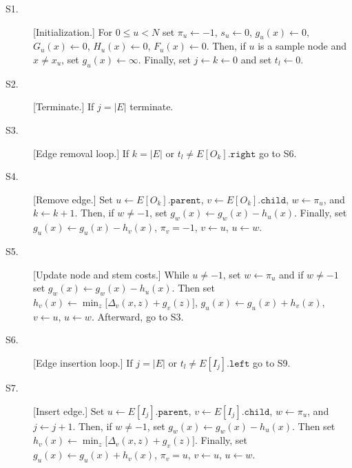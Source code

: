 \begin{description}

\item[S1.] [Initialization.]
    For $0 \leq u < N$
        set $\pi_u \leftarrow -1$,
        $s_u \leftarrow 0$,
        $g_u(x) \leftarrow 0$,
        $G_u(x) \leftarrow 0$,
        $H_u(x) \leftarrow 0$,
        $F_u(x) \leftarrow 0$.
        Then,
        if $u$ is a sample node and $x \neq x_u$,
            set $g_u(x) \leftarrow \infty$.
    Finally,
        set $j \leftarrow k \leftarrow 0$ and set $t_l \leftarrow 0$.

\item[S2.] [Terminate.]
    If $j = |E|$ terminate.

\item[S3.] [Edge removal loop.]
    If $k = |E|$ or $t_l \neq E[O_k].\texttt{right}$ go to S6.

\item[S4.] [Remove edge.]
    Set $u \leftarrow E[O_k].\texttt{parent}$,
        $v \leftarrow E[O_k].\texttt{child}$,
        $w \leftarrow \pi_u$, and
        $k \leftarrow k + 1$.
        Then,
        if $w \neq -1$,
            set $g_w(x) \leftarrow g_w(x) - h_u(x)$.
        Finally,
        set $g_u(x) \leftarrow g_u(x) - h_v(x)$,
        $\pi_v = -1$,
        $v \leftarrow u$,
        $u \leftarrow w$.

\item[S5.] [Update node and stem costs.]
    While $u \neq -1$,
        set $w \leftarrow \pi_u$ and
        if $w \neq -1$
            set $g_w(x) \leftarrow g_w(x) - h_u(x)$.
        Then set
        $h_v(x) \leftarrow \min_{z}\bigl[\Delta_v(x,z) + g_v(z)\bigr]$,
        $g_u(x) \leftarrow g_u(x) + h_v(x)$,
        $v \leftarrow u$, $u \leftarrow w$.
    Afterward, go to S3.

\item[S6.] [Edge insertion loop.]
    If $j = |E|$ or $t_l \neq E[I_j].\texttt{left}$ go to S9.

\item[S7.] [Insert edge.]
    Set $u \leftarrow E[I_j].\texttt{parent}$,
        $v \leftarrow E[I_j].\texttt{child}$,
        $w \leftarrow \pi_u$, and
        $j \leftarrow j + 1$.
        Then,
        if $w \neq -1$,
            set $g_w(x) \leftarrow g_w(x) - h_u(x)$.
        Then set
        $h_v(x) \leftarrow \min_{z}\bigl[\Delta_v(x,z) + g_v(z)\bigr]$.
        Finally,
        set $g_u(x) \leftarrow g_u(x) + h_v(x)$,
        $\pi_v = u$,
        $v \leftarrow u$,
        $u \leftarrow w$.


\end{description}
